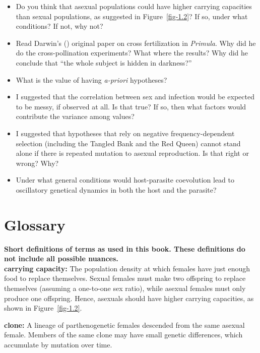 \documentclass[
  american,
  letterpaper,
]{book}
\providecommand{\tightlist}{%
  \setlength{\itemsep}{0pt}\setlength{\parskip}{0pt}}\usepackage{longtable,booktabs,array}
\begin{document}
\begin{itemize}
\tightlist
\item
  Do you think that asexual populations could have higher carrying
  capacities than sexual populations, as suggested in
  Figure~\ref{fig-1.2}? If so, under what conditions? If not, why not?
\item
  Read Darwin's () original paper on
  cross fertilization in \emph{Primula}. Why did he do the
  cross-pollination experiments? What where the results? Why did he
  conclude that ``the whole subject is hidden in darkness?''
\item
  What is the value of having \emph{a-priori} hypotheses?
\item
  I suggested that the correlation between sex and infection would be
  expected to be messy, if observed at all. Is that true? If so, then
  what factors would contribute the variance among values?
\item
  I suggested that hypotheses that rely on negative frequency-dependent
  selection (including the Tangled Bank and the Red Queen) cannot stand
  alone if there is repeated mutation to asexual reproduction. Is that
  right or wrong? Why?
\item
  Under what general conditions would host-parasite coevolution lead to
  oscillatory genetical dynamics in both the host and the parasite?
\end{itemize}


\chapter*{Glossary}\label{sec-glossary}


\textbf{Short definitions of terms as used in this book. These
definitions do not include all possible nuances.}\\

\textbf{carrying capacity:} The population density at which females have
just enough food to replace themselves. Sexual females must make two
offspring to replace themselves (assuming a one-to-one sex ratio), while
asexual females must only produce one offspring. Hence, asexuals should
have higher carrying capacities, as shown in Figure~\ref{fig-1.2}.

\textbf{clone:} A lineage of parthenogenetic females descended from the
same asexual female. Members of the same clone may have small genetic
differences, which accumulate by mutation over time.
\end{document}
